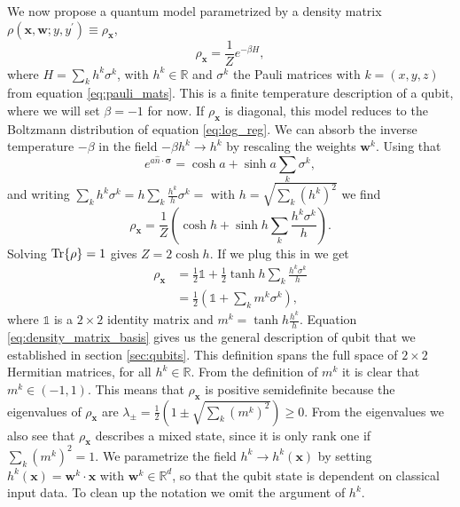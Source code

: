 \noindent We now propose a quantum model parametrized by a density matrix $\rho(\mathbf{x}, \mathbf{w}; y, y^\prime)\equiv \rho_\mathbf{x}$,
\begin{equation*}
    \rho_\mathbf{x} = \frac{1}{Z} e^{-\beta H}\label{eq:density},
\end{equation*}
where $H = \sum_k h^k \sigma^k$, with $h^k \in \mathbb{R}$ and $\sigma^k$ the Pauli matrices with $k = (x,y,z)$ from equation \ref{eq:pauli_mats}. This is a finite temperature description of a qubit, where we will set $\beta=-1$ for now. If $\rho_\mathbf{x}$ is diagonal, this model reduces to the Boltzmann distribution of equation \ref{eq:log_reg}. We can absorb the inverse temperature $-\beta$ in the field $-\beta h^k \to h^k$ by rescaling the weights $\mathbf{w}^k$. Using that 
\begin{equation*}
    e^{a \hat{n}\cdot \bm{\sigma}} = \cosh{a} + \sinh{a}\sum_k \sigma^k,
\end{equation*}
and writing $\sum_k h^k \sigma^k = h \sum_k \frac{h^k}{h} \sigma^k = $ with $h = \sqrt{\sum_k(h^k)^2}$ we find
\begin{equation*}
    \rho_\mathbf{x} = \frac{1}{Z}\left( \cosh{h} + \sinh{h}\sum_k \frac{h^k \sigma^k}{h}\right).
\end{equation*}
Solving $\Tr{\rho}=1$ gives $Z = 2 \cosh{h}$. If we plug this in we get
\begin{align}
    \rho_\mathbf{x} & = \frac{1}{2} \mathbb{1} + \frac{1}{2} \tanh{h}\sum_k \frac{h^k \sigma^k}{h}\nonumber \\
    &= \frac{1}{2} \left(\mathbb{1} + \sum_k m^k \sigma^k\right),
    \label{eq:density_matrix_basis}
\end{align}
where $\mathbb{1}$ is a $2\times2$ identity matrix and $m^k = \tanh{h}\frac{h^k}{h}$. Equation \ref{eq:density_matrix_basis} gives us the general description of qubit that we established in section \ref{sec:qubits}. This definition spans the full space of $2\times2$ Hermitian matrices, for all $h^k\in \mathbb{R}$. From the definition of $m^k$ it is clear that $m^k\in(-1,1)$. This means that $\rho_\mathbf{x}$ is positive semidefinite because the eigenvalues of $\rho_\mathbf{x}$ are $\lambda_{\pm} = \frac{1}{2}(1 \pm \sqrt{ \sum_k (m^k)^2}) \geq 0$. From the eigenvalues we also see that $\rho_\mathbf{x}$ describes a mixed state, since it is only rank one if $\sum_k (m^k)^2 = 1$. We parametrize the field $h^k\to h^k(\mathbf{x})$ by setting $h^k(\mathbf{x}) = \mathbf{w}^k\cdot \mathbf{x}$ with $\mathbf{w}^k \in \mathbb{R}^d$, so that the qubit state is dependent on classical input data. To clean up the notation we omit the argument of $h^k$. \newline

